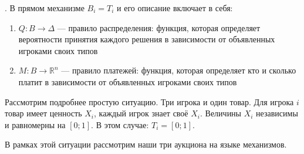 \begin{mydef} . В прямом механизме $ B_{i}=T_{i} $ и его описание включает в себя:
\begin{enumerate}
\item $ Q:B\to \Delta $ — правило распределения: функция, которая определяет вероятности принятия каждого решения в зависимости от объявленных игроками своих типов
\item $ M:B\to \mathbb{R}^{n}  $ — правило платежей: функция, которая определяет кто и сколько платит в зависимости от объявленных игроками своих типов
\end{enumerate}
\end{mydef}


Рассмотрим подробнее простую ситуацию. Три игрока и один товар. Для игрока $ i $ товар имеет ценность $ X_{i} $, каждый игрок знает своё $ X_{i} $. Величины $ X_{i}  $ независимы и равномерны на $ [0;1] $. В этом случае: $ T_{i}=[0;1] $.

В рамках этой ситуации рассмотрим наши три аукциона на языке механизмов.






